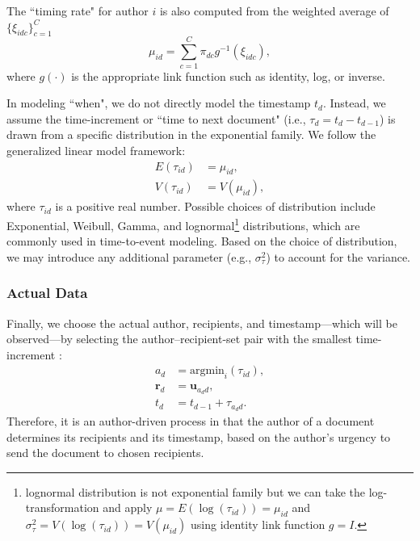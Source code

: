 \documentclass{article}
\begin{document}
The ``timing rate" for author $i$ is also computed from the weighted average of $\{\xi_{idc}\}_{c=1}^C$ 
\begin{equation}
\mu_{id} = \sum_{c=1}^C \pi_{dc} g^{-1}(\xi_{idc}),
\end{equation}
where $g(\cdot)$ is the appropriate link function such as identity, log, or inverse. 

In modeling ``when", we do not directly model the timestamp $t_d$. Instead, we assume the time-increment or ``time to next document" (i.e., $\tau_d = t_d-t_{d-1}$) is drawn from a specific distribution in the exponential family.  We follow the generalized linear model framework:
\begin{equation}
\begin{aligned}
E(\tau_{id}) &= \mu_{id},\\
V(\tau_{id}) &= V(\mu_{id}),
\end{aligned}
\end{equation}
where $\tau_{id}$ is a positive real number. Possible choices of distribution include Exponential, Weibull, Gamma, and lognormal\footnote{lognormal distribution is not exponential family but we can take the log-transformation and apply $\mu = E(\log(\tau_{id})) = \mu_{id}$ and $ \sigma_\tau^2=V(\log(\tau_{id})) = V(\mu_{id})$ using identity link function $g = I$.} distributions, which are commonly used in time-to-event modeling. Based on the choice of distribution, we may introduce any additional parameter (e.g., $\sigma_\tau^2$) to account for the variance.

\subsubsection{Actual Data}\label{subsubsec:Actual Data}
Finally, we choose the actual author, recipients, and timestamp---which will be observed---by selecting the author--recipient-set pair with the smallest time-increment \cite{snijders1996stochastic,snijders2017stochastic}:
\begin{equation}
\begin{aligned}
a_d &= \mbox{argmin}_{i}(\tau_{id}),\\
\boldsymbol{r}_d &= \boldsymbol{u}_{a_d d},\\
t_d &=t_{d-1} + \tau_{a_d d}.
\end{aligned}
\end{equation}
Therefore, it is an author-driven process in that the author of a document determines its recipients and its timestamp, based on the author's urgency to send the document to chosen recipients. 
\end{document}
